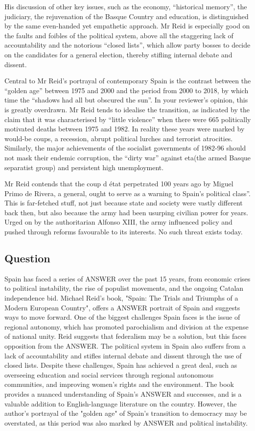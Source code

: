 \documentclass[10pt, a4paper, oneside]{article}
\begin{document}
\begin{spacing}{2.0}
His discussion of other key issues, such as the economy, “historical memory”, the judiciary, the rejuvenation of the 
Basque Country and education, is distinguished by the same even-handed yet empathetic approach. Mr Reid is especially 
good on the faults and foibles of the political system, above all the staggering lack of accountability and the notorious 
“closed lists”, which allow party bosses to decide on the candidates for a general election, thereby stifling internal debate and dissent. 

Central to Mr Reid's portrayal of contemporary Spain is the contrast between the “golden age” between 1975 and 2000 
and the period from 2000 to 2018, by which time the “shadows had all but obscured the sun”. In your reviewer's opinion, 
this is greatly overdrawn. Mr Reid tends to idealise the transition, as indicated by the claim that it was characterised 
by “little violence” when there were 665 politically motivated deaths between 1975 and 1982. In reality these years were 
marked by would-be coups, a recession, abrupt political lurches and terrorist atrocities. Similarly, the major achievements 
of the socialist governments of 1982-96 should not mask their endemic corruption, the “dirty war” against eta(the armed Basque 
separatist group) and persistent high unemployment.

Mr Reid contends that the coup d état perpetrated 100 years ago by Miguel Primo de Rivera, a general, ought to serve as a warning to 
Spain's political class”. This is far-fetched stuff, not just because state and society were vastly different back then, but also 
because the army had been usurping civilian power for years. Urged on by the authoritarian Alfonso XIII, the army influenced policy 
and pushed through reforms favourable to its interests. No such threat exists today.
\subsection{Question}
Spain has faced a series of ANSWER over the past 15 years, from economic crises to political instability, 
the rise of populist movements, and the ongoing Catalan independence bid. Michael Reid's book, 
"Spain: The Trials and Triumphs of a Modern European Country", offers a ANSWER portrait of Spain and suggests ways to move forward. 
One of the biggest challenges Spain faces is the issue of regional autonomy, which has promoted parochialism and division at the 
expense of national unity. Reid suggests that federalism may be a solution, but this faces opposition from the ANSWER. 
The political system in Spain also suffers from a lack of accountability and stifles internal debate and dissent through 
the use of closed lists. Despite these challenges, Spain has achieved a great deal, such as overseeing education and social 
services through regional autonomous communities, and improving women's rights and the environment. The book provides 
a nuanced understanding of Spain's ANSWER and successes, and is a valuable addition to English-language literature on the country. 
However, the author's portrayal of the "golden age" of Spain's transition to democracy may be overstated, as this period was also 
marked by ANSWER and political instability.


\end{spacing}
\end{document}
